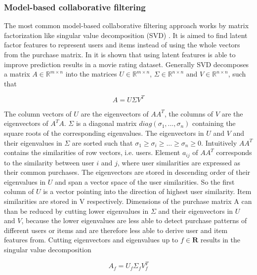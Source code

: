 \documentclass[10pt]{reportMaster}
\begin{document}
\subsubsection{Model-based collaborative filtering}
\label{sec:modelBasedCF}
The most common model-based collaborative filtering approach works by matrix factorization like singular value decomposition (SVD) \cite{svdGolubGeneral}.
It is aimed to find latent factor features to represent users and items instead of using the whole vectors from the purchase matrix.
In \cite{SVDNeuralNet} it is shown that using latent features is able to improve prediction results in a movie rating dataset.
Generally SVD decomposes a matrix $A \in \mathds{R}^{m \times n}$ into the matrices $U \in \mathds{R}^{m \times n}$, $\Sigma \in \mathds{R}^{n \times n}$ and $V \in \mathds{R}^{n \times n}$, such that 

\begin{equation}
	A = U \Sigma V^T
\end{equation}

The column vectors of $U$ are the eigenvectors of $AA^T$, the columns of $V$ are the eigenvectors of $A^TA$.
$\Sigma$ is a diagonal matrix $diag(\sigma_1, ..., \sigma_n)$ containing the square roots of the corresponding eigenvalues.  %
The eigenvectors in $U$ and $V$ and their eigenvalues in $\Sigma$ are sorted such that $\sigma_1 \geq \sigma_i \geq ... \geq \sigma_n \geq 0$.
Intuitively $AA^T$ contains the similarities of row vectors, i.e. users.
Element $a_{ij}$ of $AA^T$ corresponds to the similarity between user $i$ and $j$, where user similarities are expressed as their common purchases.
The eigenvectors are stored in descending order of their eigenvalues in $U$ and span a vector space of the user similarities.
So the first column of $U$ is a vector pointing into the direction of highest user similarity. 
Item similarities are stored in V respectively.
Dimensions of the purchase matrix A can than be reduced by cutting lower eigenvalues in $\Sigma$ and their eigenvectors in $U$ and $V$, because the lower eigenvalues are less able to detect purchase patterns of different users or items and are therefore less able to derive user and item features from.
Cutting eigenvectors and eigenvalues up to $f \in \mathbf{R}$ results in the singular value decomposition 

\begin{equation}
	A_f = U_f \Sigma_f V_f^T
\end{equation}
\end{document}
